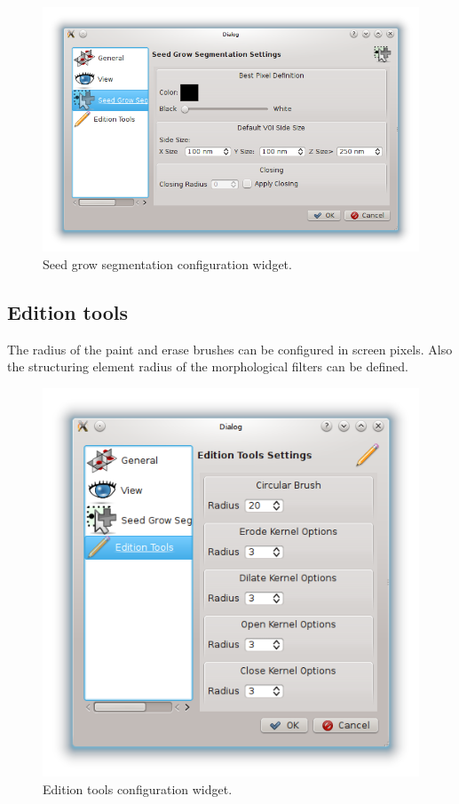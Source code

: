 \begin{figure}[H]
\centering
\includegraphics[scale=0.75]{fig/Configuration-seed}
\caption{Seed grow segmentation configuration widget.}
\end{figure}

\subsection{Edition tools}

The radius of the paint and erase brushes can be configured in screen pixels. Also the structuring element
radius of the morphological filters can be defined. \\

\begin{figure}[H]
\centering
\includegraphics[scale=0.65]{fig/Configuration-edit}
\caption{Edition tools configuration widget.}
\end{figure}

